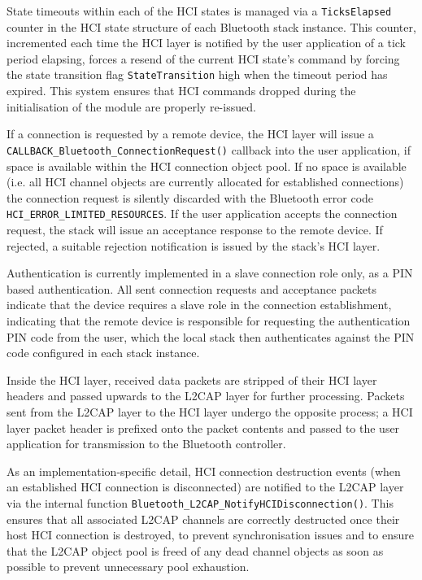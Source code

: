 State timeouts within each of the HCI states is managed via a \lstinline{TicksElapsed} counter in the HCI state structure of each Bluetooth stack instance. This counter, incremented each time the HCI layer is notified by the user application of a tick period elapsing, forces a resend of the current HCI state's command by forcing the state transition flag \lstinline{StateTransition} high when the timeout period has expired. This system ensures that HCI commands dropped during the initialisation of the module are properly re-issued.

If a connection is requested by a remote device, the HCI layer will issue a \\ \lstinline{CALLBACK_Bluetooth_ConnectionRequest()} callback into the user application, if space is available within the HCI connection object pool. If no space is available (i.e. all HCI channel objects are currently allocated for established connections) the connection request is silently discarded with the Bluetooth error code \lstinline{HCI_ERROR_LIMITED_RESOURCES}. If the user application accepts the connection request, the stack will issue an acceptance response to the remote device. If rejected, a suitable rejection notification is issued by the stack's HCI layer.

Authentication is currently implemented in a slave connection role only, as a PIN based authentication. All sent connection requests and acceptance packets indicate that the device requires a slave role in the connection establishment, indicating that the remote device is responsible for requesting the authentication PIN code from the user, which the local stack then authenticates against the PIN code configured in each stack instance.

Inside the HCI layer, received data packets are stripped of their HCI layer headers and passed upwards to the L2CAP layer for further processing. Packets sent from the L2CAP layer to the HCI layer undergo the opposite process; a HCI layer packet header is prefixed onto the packet contents and passed to the user application for transmission to the Bluetooth controller.

As an implementation-specific detail, HCI connection destruction events (when an established HCI connection is disconnected) are notified to the L2CAP layer via the internal function \lstinline{Bluetooth_L2CAP_NotifyHCIDisconnection()}. This ensures that all associated L2CAP channels are correctly destructed once their host HCI connection is destroyed, to prevent synchronisation issues and to ensure that the L2CAP object pool is freed of any dead channel objects as soon as possible to prevent unnecessary pool exhaustion.

